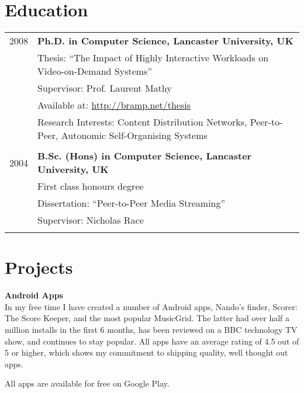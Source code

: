 \documentclass[letterpaper,10pt]{article}
\begin{document}
\section{Education}
\begin{tabularx}{\textwidth}{rX}	
 \textsc{2008} & \textbf{Ph.D. in Computer Science, Lancaster University, UK}\\
& Thesis: ``The Impact of Highly Interactive Workloads on Video-on-Demand Systems''\\
& Supervisor: Prof. Laurent Mathy\\
& Available at: \href{http://bramp.net/thesis}{http://bramp.net/thesis}\\
& Research Interests: Content Distribution Networks, Peer-to-Peer, Autonomic Self-Organising Systems\\
&\\

\textsc{2004} & \textbf{B.Sc. (Hons) in Computer Science, Lancaster University, UK}\\
& First class honours degree\\
& Dissertation: ``Peer-to-Peer Media Streaming''\\
& Supervisor: Nicholas Race\\
&\\


\end{tabularx}
\clearpage
\section{Projects}

\textbf{Android Apps}\\
In my free time I have created a number of Android apps, Nando's finder, Scorer: The Score Keeper, and the most popular MusicGrid.
The latter had over half a million installs in the first 6 months, has been reviewed on a BBC technology TV show, and continues
to stay popular. All apps have an average rating of 4.5 out of 5 or higher, which shows my commitment to shipping quality, well thought out apps.

All apps are available for free on Google Play.

\vspace{1em}
\end{document}
